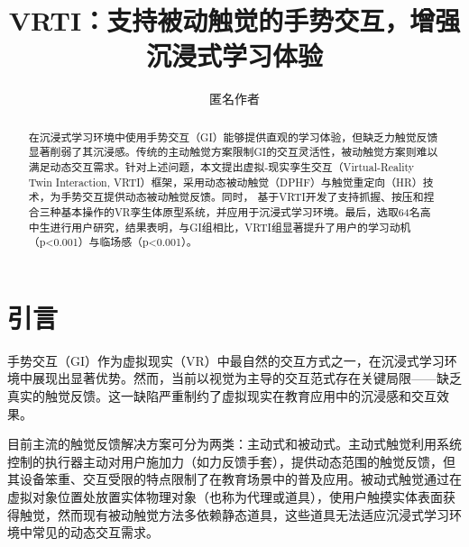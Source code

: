 \documentclass[runningheads]{llncs}
\begin{document}
\title{VRTI：支持被动触觉的手势交互，增强沉浸式学习体验}

 


\author{匿名作者}

\maketitle


\begin{abstract}
在沉浸式学习环境中使用手势交互（GI）能够提供直观的学习体验，但缺乏力触觉反馈显著削弱了其沉浸感。传统的主动触觉方案限制GI的交互灵活性，被动触觉方案则难以满足动态交互需求。针对上述问题，本文提出虚拟-现实孪生交互（Virtual-Reality Twin Interaction, VRTI）框架，采用动态被动触觉（DPHF）与触觉重定向（HR）技术，为手势交互提供动态被动触觉反馈。同时，
基于VRTI开发了支持抓握、按压和捏合三种基本操作的VR孪生体原型系统，并应用于沉浸式学习环境。最后，选取64名高中生进行用户研究，结果表明，与GI组相比，VRTI组显著提升了用户的学习动机（p<0.001）与临场感（p<0.001）。

\end{abstract}

\section{引言}
手势交互（GI）作为虚拟现实（VR）中最自然的交互方式之一，在沉浸式学习环境中展现出显著优势\cite{fang2024interactive,amaral2024interactive}。然而，当前以视觉为主导的交互范式存在关键局限——缺乏真实的触觉反馈。这一缺陷严重制约了虚拟现实在教育应用中的沉浸感和交互效果。

目前主流的触觉反馈解决方案可分为两类：主动式和被动式。主动式触觉利用系统控制的执行器主动对用户施加力（如力反馈手套），提供动态范围的触觉反馈，但其设备笨重、交互受限的特点限制了在教育场景中的普及应用\cite{bonfert2023challenges,shigeyama2019transcalibur}。被动式触觉通过在虚拟对象位置处放置实体物理对象（也称为代理或道具），使用户触摸实体表面获得触觉\cite{hinckley1994passive}，然而现有被动触觉方法多依赖静态道具\cite{strandholt2020knock,fang2023vr,rettinger2023touching}，这些道具无法适应沉浸式学习环境中常见的动态交互需求。
\end{document}
